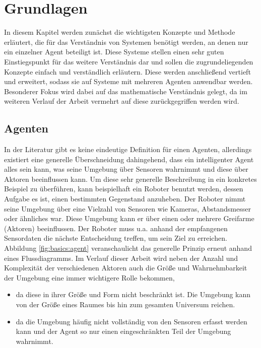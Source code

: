\chapter{Grundlagen}
In diesem Kapitel werden zunächst die wichtigsten Konzepte und Methode erläutert, die für das Verständnis von Systemen benötigt werden, an denen nur ein einzelner Agent beteiligt ist. Diese Systeme stellen einen sehr guten Einstiegspunkt für das weitere Verständnis dar und sollen die zugrundeliegenden Konzepte einfach und verständlich erläutern.
Diese werden anschließend vertieft und erweitert, sodass sie auf Systeme mit mehreren Agenten anwendbar werden. \\
Besonderer Fokus wird dabei auf das mathematische Verständnis gelegt, da im weiteren Verlauf der Arbeit vermehrt auf diese zurückgegriffen werden wird.

\section{Agenten}

In der Literatur gibt es keine eindeutige Definition für einen Agenten, allerdings existiert eine generelle Überschneidung dahingehend, dass ein intelligenter Agent alles sein kann, was seine Umgebung über Sensoren wahrnimmt und diese über Aktoren beeinflussen kann.
Um diese sehr generelle Beschreibung in ein konkretes Beispiel zu überführen, kann beispielhaft ein Roboter benutzt werden, dessen Aufgabe es ist, einen bestimmten Gegenstand anzuheben. Der Roboter nimmt seine Umgebung über eine Vielzahl von Sensoren wie \zB Kameras, Abstandsmesser oder ähnliches war. Diese Umgebung kann er \zB über einen oder mehrere Greifarme (Aktoren) beeinflussen. Der Roboter muss u.a. anhand der empfangenen Sensordaten die nächste Entscheidung treffen, um sein Ziel zu erreichen.
Abbildung \ref{fig:basics:agent} veranschaulicht das generelle Prinzip erneut anhand eines Flussdiagramms.
Im Verlauf dieser Arbeit wird neben der Anzahl und Komplexität der verschiedenen Aktoren auch die Größe und Wahrnehmbarkeit der Umgebung eine immer wichtigere Rolle bekommen,

\begin{itemize}
	\item da diese in ihrer Größe und Form nicht beschränkt ist. Die Umgebung kann \zB von der Größe eines Raumes bis hin zum gesamten Universum reichen.
	\item da die Umgebung häufig nicht vollständig von den Sensoren erfasst werden kann und der Agent so nur einen eingeschränkten Teil der Umgebung wahrnimmt.
\end{itemize}

